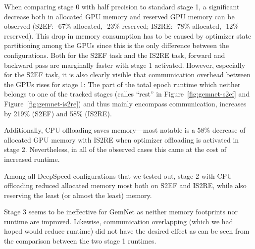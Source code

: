 When comparing stage 0 with half precision to standard stage 1, a significant decrease
both in allocated GPU memory and reserved GPU memory can be observed
(S2EF: -67\% allocated, -23\% reserved; IS2RE: -78\% allocated, -12\% reserved).
This drop in memory consumption has to be caused by optimizer state partitioning among
the GPUs since this is the only difference between the configurations. 
Both for the S2EF task and the IS2RE task, forward and backward pass 
are marginally faster with stage 1 activated. 
However, especially for the S2EF task, it is also clearly visible that communication overhead 
between the GPUs rises for stage 1: The part of the total epoch runtime which
neither belongs to one of the tracked stages (calles \enquote{rest} in 
Figure~\ref{fig:gemnet-s2ef} and Figure~\ref{fig:gemnet-is2re}) and thus mainly 
encompass communication, increases by 219\% (S2EF) and 58\% (IS2RE).

Additionally, CPU offloading saves memory---most notable is a 58\% decrease of allocated GPU 
memory with IS2RE when optimizer offloading is activated in stage 2. 
Nevertheless, in all of the observed cases this came at the cost of increased runtime.

Among all DeepSpeed configurations that we tested out, stage 2 with CPU offloading 
reduced allocated memory most both on S2EF and IS2RE, while also reserving the least 
(or almost the least) memory.

Stage 3 seems to be ineffective for GemNet as neither memory footprints nor 
runtime are improved. Likewise, communication overlapping (which we had hoped would
reduce runtime) did not have the desired effect as can be seen from the comparison 
between the two stage 1 runtimes.

